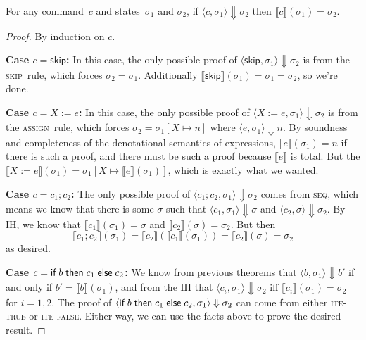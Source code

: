 \documentclass{lecturenotes}
\newcommand{\Skip}{\textsf{skip}}
\newcommand{\ite}[3]{\ensuremath{\textsf{if}\mkern5mu#1 \mathrel{\textsf{then}} #2 \mathrel{\textsf{else}} #3}}
\begin{document}
\begin{thm}
  For any command~$c$ and states~$\sigma_1$ and $\sigma_2$, if $\langle c, \sigma_1 \rangle \Downarrow \sigma_2$ then $\llbracket c \rrbracket(\sigma_1) = \sigma_2$.
\end{thm}
\begin{proof}
  By induction on $c$.

  \noindent\textbf{Case $c = \Skip$:}
  In this case, the only possible proof of $\langle \Skip , \sigma_1 \rangle \Downarrow \sigma_2$ is from the \textsc{skip}~rule, which forces $\sigma_2 = \sigma_1$.
  Additionally $\llbracket \Skip \rrbracket(\sigma_1) = \sigma_1 = \sigma_2$, so we're done.

  \noindent\textbf{Case $c = X := e$:}
  In this case, the only possible proof of $\langle X := e , \sigma_1 \rangle \Downarrow \sigma_2$ is from the \textsc{assign}~rule, which forces $\sigma_2 = \sigma_1[X \mapsto n]$ where $\langle e, \sigma_1 \rangle \Downarrow n$.
  By soundness and completeness of the denotational semantics of expressions, $\llbracket e \rrbracket(\sigma_1) = n$ if there is such a proof, and there must be such a proof because $\llbracket e \rrbracket$ is total.
  But the $\llbracket X := e \rrbracket(\sigma_1) = \sigma_1[X \mapsto \llbracket e \rrbracket(\sigma_1)]$, which is exactly what we wanted.

  \noindent\textbf{Case $c = c_1; c_2$:}
  The only possible proof of $\langle c_1; c_2, \sigma_1 \rangle \Downarrow \sigma_2$ comes from \textsc{seq}, which means we know that there is some $\sigma$ such that $\langle c_1, \sigma_1 \rangle \Downarrow \sigma$ and $\langle c_2, \sigma \rangle \Downarrow \sigma_2$.
  By IH, we know that $\llbracket c_1 \rrbracket(\sigma_1) = \sigma$ and $\llbracket c_2 \rrbracket(\sigma) = \sigma_2$.
  But then $$\llbracket c_1; c_2 \rrbracket(\sigma_1) = \llbracket c_2 \rrbracket(\llbracket c_1 \rrbracket(\sigma_1)) = \llbracket c_2 \rrbracket(\sigma) = \sigma_2$$ as desired.

  \noindent\textbf{Case $c = \ite{b}{c_1}{c_2}$:}
  We know from previous theorems that $\langle b, \sigma_1 \rangle \Downarrow b'$ if and only if $b' = \llbracket b \rrbracket(\sigma_1)$, and from the IH that $\langle c_i, \sigma_1 \rangle \Downarrow \sigma_2$ iff $\llbracket c_i \rrbracket(\sigma_1) = \sigma_2$ for $i=1,2$.
  The proof of $\langle\ite{b}{c_1}{c_2}, \sigma_1\rangle \Downarrow \sigma_2$ can come from either \textsc{ite-true} or \textsc{ite-false}.
  Either way, we can use the facts above to prove the desired result.


\end{proof}
\end{document}
